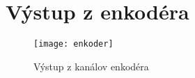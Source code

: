 \chapter{Výstup z enkodéra}
\begin{figure}[h]
\centering
\texttt{[image: enkoder]}
\caption{Výstup z kanálov enkodéra}
\label{fig:enkoder}
\end{figure}